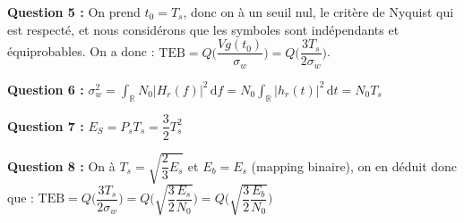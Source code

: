 \documentclass[12pt,a4paper]{article}
\begin{document}
\textbf{Question 5 :}
On prend $t_0 = T_s$, donc on à un seuil nul, le critère de Nyquist qui est respecté, et nous considérons que les symboles sont indépendants et équiprobables.
On a donc : $\displaystyle \text{TEB}= Q\bigg (\dfrac{V g(t_0)}{\sigma_w} \bigg) =Q\bigg (\dfrac{3T_s}{2\sigma_w} \bigg) $.
\vspace{0.5cm}
\par
\textbf{Question 6 :} $ \displaystyle\sigma^2_w = \int_{\mathbb{R}} N_0 | H_r(f)|^2 \,\mathrm{d}f = N_0 \int_{\mathbb{R}} |h_r(t)|^2 \,\mathrm{d}t = N_0 T_s$
\newline \par

\textbf{Question 7 :} $E_S = P_sT_s = \dfrac{3}{2}T_s^2$
\newline \par

\textbf{Question 8 :} On à $T_s = \sqrt{\dfrac{2}{3}E_s}$ et $E_b = E_s$ (mapping binaire), on  en déduit donc que : \newline
 $\displaystyle \text{TEB} =Q\bigg (\dfrac{3T_s}{2\sigma_w} \bigg) = Q\bigg(\sqrt{\dfrac{3}{2}\dfrac{E_s}{N_0}}\bigg)= Q\bigg(\sqrt{\dfrac{3}{2}\dfrac{E_b}{N_0}}\bigg)$ \newline
 
\end{document}
